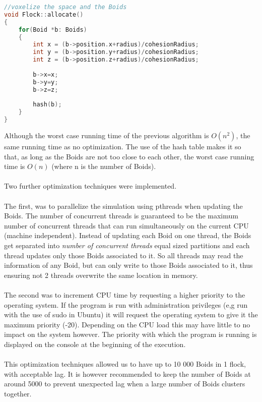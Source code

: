 \documentclass[12pt]{article}
\begin{document}
\begin{minipage}[t]{\textwidth}
\begin{lstlisting}[language=C++]
//voxelize the space and the Boids
void Flock::allocate()
{
	for(Boid *b: Boids)
	{
		int x = (b->position.x+radius)/cohesionRadius;
		int y = (b->position.y+radius)/cohesionRadius;
		int z = (b->position.z+radius)/cohesionRadius;
		
		b->x=x;
		b->y=y;
		b->z=z;
		
		hash(b);
	}
}
\end{lstlisting}
\end{minipage}

Although the worst case running time of the previous algorithm is $O(n^2)$, the same running time as no optimization. The use of the hash table makes it so that, as long as the Boids are not too close to each other, the worst case running time is $O(n)$ (where n is the number of Boids).
\\ \\

Two further optimization techniques were implemented. 
\\ \\
The first, was to  parallelize the simulation using   pthreads when updating the Boids. The number of concurrent threads is guaranteed to be the maximum number of concurrent threads that can run simultaneously on the current CPU (machine independent). Instead of updating each Boid on one thread, the Boids get separated into \textit{number of concurrent threads} equal sized partitions and each thread updates only those Boids associated to it. So all threads may read the information of any Boid, but can only write to those Boids associated to it, thus ensuring not 2 threads overwrite the same location in memory.
\\ \\
The second was to increment CPU time by requesting a higher priority to the operating system. If the program is run with administration privileges (e,g run with the use of sudo in Ubuntu) it will request the operating system to give it the maximum priority (-20). Depending on the CPU load this may have little to no impact on the system however. The priority with which the program is running is displayed on the console at the beginning of the execution.
\\ \\
This optimization techniques allowed us to have up to 10 000 Boids in 1 flock, with acceptable lag.
It is however recommended to keep the number of Boids at around 5000 to prevent unexpected lag when a large number of Boids clusters together.
\end{document}
